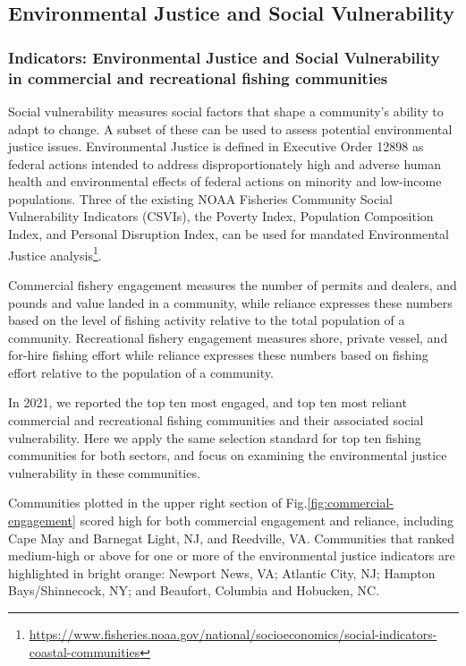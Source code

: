 \documentclass[
  10pt,
]{article}
\begin{document}
\hypertarget{environmental-justice-and-social-vulnerability}{%
\subsection{Environmental Justice and Social
Vulnerability}\label{environmental-justice-and-social-vulnerability}}

\hypertarget{indicators-environmental-justice-and-social-vulnerability-in-commercial-and-recreational-fishing-communities}{%
\subsubsection{Indicators: Environmental Justice and Social
Vulnerability in commercial and recreational fishing
communities}\label{indicators-environmental-justice-and-social-vulnerability-in-commercial-and-recreational-fishing-communities}}

Social vulnerability measures social factors that shape a community's
ability to adapt to change. A subset of these can be used to assess
potential environmental justice issues. Environmental Justice is defined
in Executive Order 12898 as federal actions intended to address
disproportionately high and adverse human health and environmental
effects of federal actions on minority and low-income populations. Three
of the existing NOAA Fisheries Community Social Vulnerability Indicators
(CSVIs), the Poverty Index, Population Composition Index, and Personal
Disruption Index, can be used for mandated Environmental Justice
analysis\footnote{\url{https://www.fisheries.noaa.gov/national/socioeconomics/social-indicators-coastal-communities}}.

Commercial fishery engagement measures the number of permits and
dealers, and pounds and value landed in a community, while reliance
expresses these numbers based on the level of fishing activity relative
to the total population of a community. Recreational fishery engagement
measures shore, private vessel, and for-hire fishing effort while
reliance expresses these numbers based on fishing effort relative to the
population of a community.

In 2021, we reported the top ten most engaged, and top ten most reliant
commercial and recreational fishing communities and their associated
social vulnerability. Here we apply the same selection standard for top
ten fishing communities for both sectors, and focus on examining the
environmental justice vulnerability in these communities.

Communities plotted in the upper right section of
Fig.\ref{fig:commercial-engagement} scored high for both commercial
engagement and reliance, including Cape May and Barnegat Light, NJ, and
Reedville, VA. Communities that ranked medium-high or above for one or
more of the environmental justice indicators are highlighted in bright
orange: Newport News, VA; Atlantic City, NJ; Hampton Bays/Shinnecock,
NY; and Beaufort, Columbia and Hobucken, NC.
\end{document}
